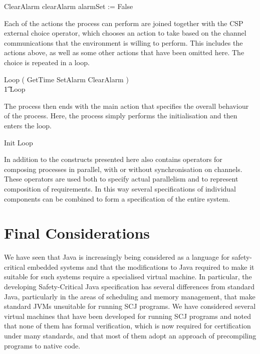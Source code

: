 \documentclass[a4paper,10pt]{report}
\begin{document}
%
\begin{circusaction}
  ClearAlarm \circdef clearAlarm \then alarmSet := False
\end{circusaction}
%
Each of the actions the process can perform are joined together with the CSP
external choice operator, which chooses an action to take based on the channel
communications that the environment is willing to perform. This includes the
actions above, as well as some other actions that have been omitted here. The
choice is repeated in a loop.
%
\begin{circusaction}
  Loop \circdef \left( GetTime \extchoice SetAlarm \extchoice ClearAlarm
    \extchoice \cdots \right) \\
  \t1 \circseq Loop
\end{circusaction}
%
The \Circus{} process then ends with the main action that specifies the overall
behaviour of the process. Here, the process simply performs the initialisation
and then enters the loop.
%
\begin{circusaction}
  \circspot Init \circseq Loop
\end{circusaction}
\begin{circus}
  \circend
\end{circus}

In addition to the constructs presented here \Circus{} also contains operators
for composing processes in parallel, with or without synchronisation on
channels.  These operators are used both to specify actual parallelism and to
represent composition of requirements.  In this way several \Circus{}
specifications of individual components can be combined to form a specification
of the entire system.

\section{Final Considerations}
\label{final-considerations-section}


We have seen that Java is increasingly being considered as a language for
safety-critical embedded systems and that the modifications to Java required to
make it suitable for such systems require a specialised virtual machine.  In
particular, the developing Safety-Critical Java specification has several
differences from standard Java, particularly in the areas of scheduling and
memory management, that make standard JVMs unsuitable for running SCJ programs.
We have considered several virtual machines that have been developed for running
SCJ programs and noted that none of them has formal verification, which is now
required for certification under many standards, and that most of them adopt an
approach of precompiling programs to native code.
\end{document}

